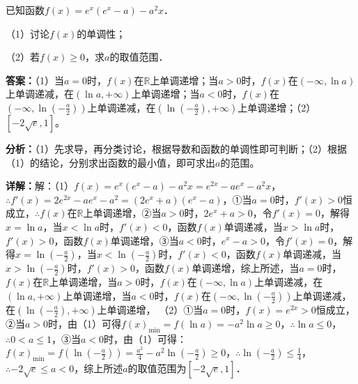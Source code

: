\begin{question}[points=12]
已知函数$f(x)=e^x(e^x-a)-a^2x$．

（1）讨论$f(x)$的单调性；

（2）若$f(x)\ge0$，求$a$的取值范围．
\begin{solution}
\textbf{答案：}（1）当$a=0$时，$f(x)$在$\mathbb{R}$上单调递增；当$a>0$时，$f(x)$在$(-\infty,\ln a)$上单调递减，在$(\ln a,+\infty)$上单调递增；当$a<0$时，$f(x)$在$(-\infty,\ln(-\frac{a}{2}))$上单调递减，在$(\ln(-\frac{a}{2}),+\infty)$上单调递增；（2）$[-2\sqrt{e},1]$。

\textbf{分析：}（1）先求导，再分类讨论，根据导数和函数的单调性即可判断；（2）根据（1）的结论，分别求出函数的最小值，即可求出$a$的范围。

\textbf{详解：}解：（1）$f(x)=e^x(e^x-a)-a^2x=e^{2x}-ae^x-a^2x$，$\therefore f'(x)=2e^{2x}-ae^x-a^2=(2e^x+a)(e^x-a)$，①当$a=0$时，$f'(x)>0$恒成立，$\therefore f(x)$在$\mathbb{R}$上单调递增，②当$a>0$时，$2e^x+a>0$，令$f'(x)=0$，解得$x=\ln a$，当$x<\ln a$时，$f'(x)<0$，函数$f(x)$单调递减，当$x>\ln a$时，$f'(x)>0$，函数$f(x)$单调递增，③当$a<0$时，$e^x-a>0$，令$f'(x)=0$，解得$x=\ln(-\frac{a}{2})$，当$x<\ln(-\frac{a}{2})$时，$f'(x)<0$，函数$f(x)$单调递减，当$x>\ln(-\frac{a}{2})$时，$f'(x)>0$，函数$f(x)$单调递增，综上所述，当$a=0$时，$f(x)$在$\mathbb{R}$上单调递增，当$a>0$时，$f(x)$在$(-\infty,\ln a)$上单调递减，在$(\ln a,+\infty)$上单调递增，当$a<0$时，$f(x)$在$(-\infty,\ln(-\frac{a}{2}))$上单调递减，在$(\ln(-\frac{a}{2}),+\infty)$上单调递增，
（2）①当$a=0$时，$f(x)=e^{2x}>0$恒成立，②当$a>0$时，由（1）可得$f(x)_{\min}=f(\ln a)=-a^2\ln a\ge0$，$\therefore\ln a\le0$，$\therefore0<a\le1$，③当$a<0$时，由（1）可得：$f(x)_{\min}=f(\ln(-\frac{a}{2}))=\frac{a^2}{4}-a^2\ln(-\frac{a}{2})\ge0$，$\therefore\ln(-\frac{a}{2})\le\frac{1}{4}$，$\therefore -2\sqrt{e}\le a<0$，综上所述$a$的取值范围为$[-2\sqrt{e},1]$．
\end{solution}
\end{question}

